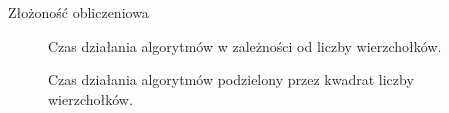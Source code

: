 \begin{frame}[squeeze]{Złożoność obliczeniowa}

    \begin{figure}[H]
        \centering
        \begin{minipage}[t]{0.45\textwidth}
            \centering
            \caption{Czas działania algorytmów w zależności od liczby wierzchołków.}
        \end{minipage}
        \hspace{0.03\textwidth}
        \begin{minipage}[t]{0.45\textwidth}
            \centering
            \caption{Czas działania algorytmów podzielony przez kwadrat liczby wierzchołków.}
        \end{minipage}
    \end{figure} 
\end{frame}